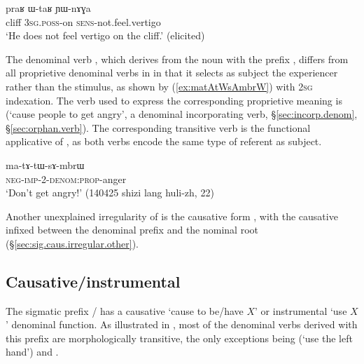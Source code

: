 \begin{exe}
\ex \label{ex:YWnAGA}
 \gll  praʁ ɯ-taʁ ɲɯ-nɤɣa \\
 cliff \textsc{3sg}.\textsc{poss}-on \textsc{sens}-not.feel.vertigo \\
 \glt `He does not feel vertigo on the cliff.' (elicited) 
  \end{exe}

The denominal verb , which derives from the noun  with the prefix , differs from all proprietive denominal verbs in  in that it selects as subject the experiencer rather than the stimulus, as shown by (\ref{ex:matAtWsAmbrW}) with \textsc{2sg} indexation. The verb used to express the corresponding proprietive meaning is  (`cause people to get angry', a denominal incorporating verb, §\ref{sec:incorp.denom}, §\ref{sec:orphan.verb}). The corresponding transitive verb   is the functional applicative of , as both verbs encode the same type of referent as subject.

\begin{exe}
\ex \label{ex:matAtWsAmbrW}
\gll ma-tɤ-tɯ-sɤ-mbrɯ \\
\textsc{neg}-\textsc{imp}-2-\textsc{denom}:\textsc{prop}-anger \\
\glt `Don't get angry!' (140425 shizi lang huli-zh, 22)
\end{exe}

Another unexplained irregularity of  is the causative form , with the causative  infixed between the denominal prefix and the nominal root (§\ref{sec:sig.caus.irregular.other}).
 

\subsection{Causative/instrumental  } \label{sec:denom.sW.caus.instr}
The sigmatic prefix / has a causative `cause to be/have $X$' or instrumental `use $X$' denominal function. As illustrated in , most of the denominal verbs derived with this prefix are morphologically transitive, the only exceptions being  (`use the left hand') and .

